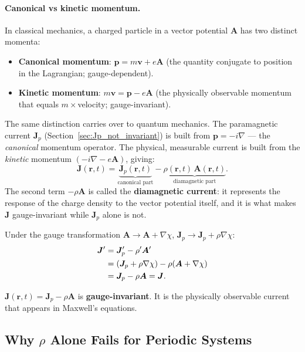 \documentclass[12pt,letterpaper]{article}
\theoremstyle{definition}
\begin{document}
\paragraph{Canonical vs kinetic momentum.}
In classical mechanics, a charged particle in a vector potential $\bm{A}$
has two distinct momenta:
\begin{itemize}[noitemsep]
  \item \textbf{Canonical momentum}: $\bm{p} = m\bm{v} + e\bm{A}$
    (the quantity conjugate to position in the Lagrangian; gauge-dependent).
  \item \textbf{Kinetic momentum}: $m\bm{v} = \bm{p} - e\bm{A}$
    (the physically observable momentum that equals $m\times$velocity;
    gauge-invariant).
\end{itemize}
The same distinction carries over to quantum mechanics.
The paramagnetic current $\bm{J}_p$ (Section~\ref{sec:Jp_not_invariant})
is built from $\bm{p} = -i\nabla$ — the \emph{canonical} momentum operator.
The physical, measurable current is built from the \emph{kinetic} momentum
$(-i\nabla - e\bm{A})$, giving:
\begin{equation}
  \bm{J}(\bm{r},t)
  = \underbrace{\bm{J}_p(\bm{r},t)}_{\text{canonical part}}
  - \underbrace{\rho(\bm{r},t)\,\bm{A}(\bm{r},t)}_{\text{diamagnetic part}}.
  \label{eq:J_total}
\end{equation}
The second term $-\rho\bm{A}$ is called the \textbf{diamagnetic current}:
it represents the response of the charge density to the vector potential
itself, and it is what makes $\bm{J}$ gauge-invariant while $\bm{J}_p$
alone is not.

\begin{derivbox}
Under the gauge transformation $\bm{A}\to\bm{A}+\nabla\chi$,
$\bm{J}_p\to\bm{J}_p + \rho\nabla\chi$:
\begin{align}
  \bm{J}' &= \bm{J}_p' - \rho'\bm{A}' \notag\\
  &= (\bm{J}_p + \rho\nabla\chi) - \rho(\bm{A}+\nabla\chi) \notag\\
  &= \bm{J}_p - \rho\bm{A} = \bm{J}.
  \label{eq:J_invariant}
\end{align}
\end{derivbox}

\begin{keyresult}
$\bm{J}(\bm{r},t) = \bm{J}_p - \rho\bm{A}$ is \textbf{gauge-invariant}.
It is the physically observable current that appears in Maxwell's equations.
\end{keyresult}

\subsection{Why $\rho$ Alone Fails for Periodic Systems}
\end{document}
